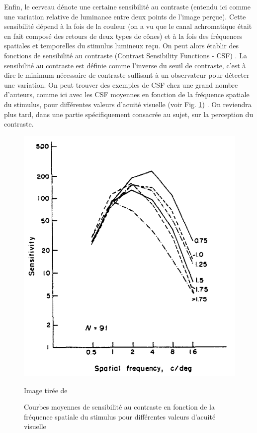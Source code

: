 	\par Enfin, le cerveau dénote une certaine sensibilité au contraste (entendu ici comme une variation relative de luminance entre deux points de l'image perçue). Cette sensibilité dépend à la fois de la couleur (on a vu que le canal achromatique était en fait composé des retours de deux types de cônes) et à la fois des fréquences spatiales et temporelles du stimulus lumineux reçu. On peut alors établir des fonctions de sensibilité au contraste (Contrast Sensibility Functions - CSF) \citep{driscoll_eyes_1978,bezzubik_modeling_2015}. La sensibilité au contraste est définie comme l'inverse du seuil de contraste, c'est à dire le minimum nécessaire de contraste suffisant à un observateur pour détecter une variation. On peut trouver des exemples de CSF chez une grand nombre d'auteurs, comme ici avec les CSF moyennes en fonction de la fréquence spatiale du stimulus, pour différentes valeurs d'acuité visuelle (voir Fig. \ref{fig:contrast_sensitivity_functions_acuity}) \citep{owsley_contrast_1983}. On reviendra plus tard, dans une partie spécifiquement consacrée au sujet, sur la perception du contraste.
	
	\begin{figure}
		\centering
		\includegraphics[scale=.45]{Figures/ContrastSensitivityFunctionAcuity}
		\caption{Courbes moyennes de sensibilité au contraste en fonction de la fréquence spatiale du stimulus pour différentes valeurs d'acuité visuelle}{Image tirée de \citep{owsley_contrast_1983}}
		\label{fig:contrast_sensitivity_functions_acuity}
	\end{figure}
	
